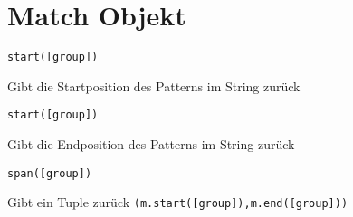 \documentclass[ignorenonframetext,]{beamer}
\begin{document}
\section{Match Objekt}\label{match-objekt}

\begin{frame}[fragile]

\begin{verbatim}
start([group])
\end{verbatim}

Gibt die Startposition des Patterns im String zurück

\begin{verbatim}
start([group])
\end{verbatim}

Gibt die Endposition des Patterns im String zurück

\begin{verbatim}
span([group])
\end{verbatim}

Gibt ein Tuple zurück \texttt{(m.start({[}group{]}),m.end({[}group{]}))}

\end{frame}
\end{document}
